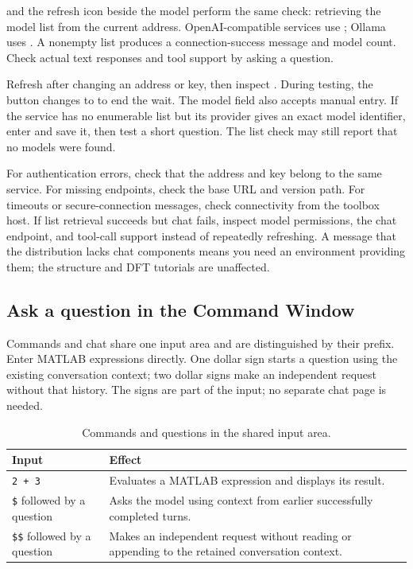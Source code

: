  and the refresh icon beside the model perform the same check: retrieving the model list from the current address. OpenAI-compatible services use ; Ollama uses . A nonempty list produces a connection-success message and model count. Check actual text responses and tool support by asking a question.

Refresh after changing an address or key, then inspect . During testing, the button changes to  to end the wait. The model field also accepts manual entry. If the service has no enumerable list but its provider gives an exact model identifier, enter and save it, then test a short question. The list check may still report that no models were found.

For authentication errors, check that the address and key belong to the same service. For missing endpoints, check the base URL and version path. For timeouts or secure-connection messages, check connectivity from the toolbox host. If list retrieval succeeds but chat fails, inspect model permissions, the chat endpoint, and tool-call support instead of repeatedly refreshing. A message that the distribution lacks chat components means you need an environment providing them; the structure and DFT tutorials are unaffected.

\subsection{Ask a question in the Command Window}\label{sec:chat-use}

Commands and chat share one input area and are distinguished by their prefix. Enter MATLAB\regmark{} expressions directly. One dollar sign starts a question using the existing conversation context; two dollar signs make an independent request without that history. The signs are part of the input; no separate chat page is needed.

\begin{table}[!htb]
\centering
\caption{Commands and questions in the shared input area.}
\label{tab:command-chat-prefix}
\begin{tabularx}{\linewidth}{lX}
\toprule
Input & Effect \\
\midrule
\texttt{2 + 3} & Evaluates a MATLAB\regmark{} expression and displays its result.\\
\texttt{\$} followed by a question & Asks the model using context from earlier successfully completed turns.\\
\texttt{\$\$} followed by a question & Makes an independent request without reading or appending to the retained conversation context.\\
\bottomrule
\end{tabularx}
\end{table}

